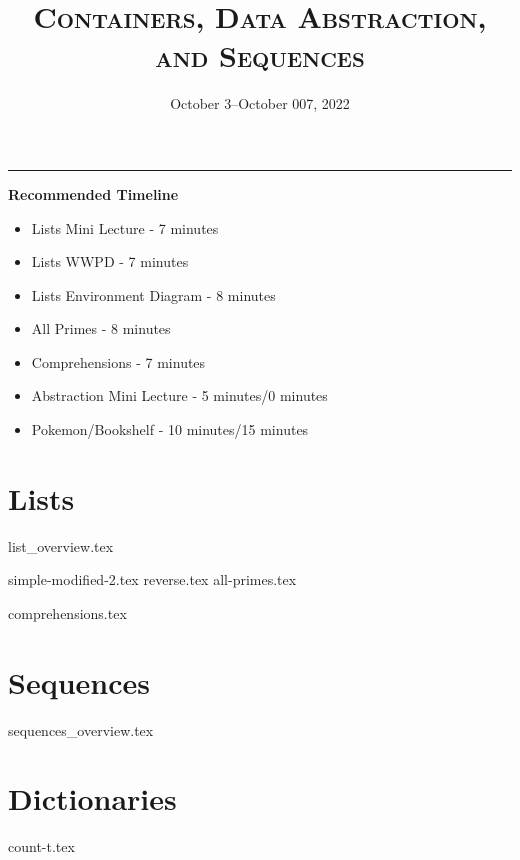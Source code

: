 \documentclass{exam}
\title{\textsc{Containers, Data Abstraction, \titlebreak and Sequences}}
\date{October 3--October 007, 2022}
\begin{document}
\maketitle
\rule{\textwidth}{0.15em}
\fontsize{12}{15}\selectfont


\begin{guide}
    \textbf{Recommended Timeline}
    \begin{itemize}
        \item Lists Mini Lecture - 7 minutes
        \item Lists WWPD - 7 minutes
        \item Lists Environment Diagram - 8 minutes
        \item All Primes - 8 minutes
        \item Comprehensions - 7 minutes
        \item Abstraction Mini Lecture - 5 minutes/0 minutes
        \item Pokemon/Bookshelf - 10 minutes/15 minutes
    \end{itemize}
\end{guide}

\section{Lists}
{list_overview.tex}
\begin{questions}
    {simple-modified-2.tex}
    {reverse.tex}
    \newpage %
    {all-primes.tex}
    
    {comprehensions.tex}
\end{questions}

\newpage
\section{Sequences}
{sequences_overview.tex}


\newpage

\newpage
\section{Dictionaries}
\begin{questions}
    {count-t.tex}
\end{questions}
\end{document}
